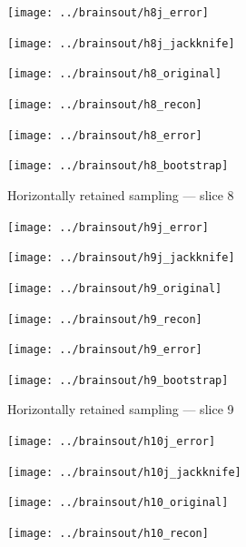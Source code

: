 \documentclass[article]{jdssv}
\begin{document}
\begin{appendix}
\begin{figure}
\begin{centering}
\parbox{\imsize}{\texttt{[image: ../brainsout/h8j\_error]}}
\parbox{\imsize}{\texttt{[image: ../brainsout/h8j\_jackknife]}}

\vspace{\vertsep}

\parbox{\imsize}{\texttt{[image: ../brainsout/h8\_original]}}
\parbox{\imsize}{\texttt{[image: ../brainsout/h8\_recon]}}

\vspace{\vertsep}

\parbox{\imsize}{\texttt{[image: ../brainsout/h8\_error]}}
\parbox{\imsize}{\texttt{[image: ../brainsout/h8\_bootstrap]}}

\end{centering}
\caption{Horizontally retained sampling --- slice 8}
\end{figure}


\begin{figure}
\begin{centering}

\parbox{\imsize}{\texttt{[image: ../brainsout/h9j\_error]}}
\parbox{\imsize}{\texttt{[image: ../brainsout/h9j\_jackknife]}}

\vspace{\vertsep}

\parbox{\imsize}{\texttt{[image: ../brainsout/h9\_original]}}
\parbox{\imsize}{\texttt{[image: ../brainsout/h9\_recon]}}

\vspace{\vertsep}

\parbox{\imsize}{\texttt{[image: ../brainsout/h9\_error]}}
\parbox{\imsize}{\texttt{[image: ../brainsout/h9\_bootstrap]}}

\end{centering}
\caption{Horizontally retained sampling --- slice 9}
\end{figure}


\begin{figure}
\begin{centering}

\parbox{\imsize}{\texttt{[image: ../brainsout/h10j\_error]}}
\parbox{\imsize}{\texttt{[image: ../brainsout/h10j\_jackknife]}}

\vspace{\vertsep}

\parbox{\imsize}{\texttt{[image: ../brainsout/h10\_original]}}
\parbox{\imsize}{\texttt{[image: ../brainsout/h10\_recon]}}

\vspace{\vertsep}


\end{centering}
\end{figure}
\end{appendix}
\end{document}
